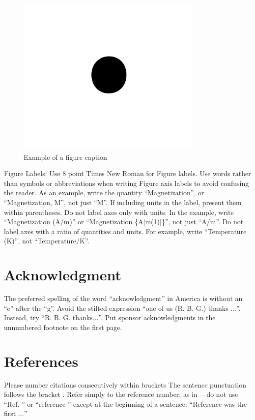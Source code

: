 \documentclass[conference]{IEEEtran}
\begin{document}
\begin{figure}[htbp]
\centering
\includegraphics[width=.9\linewidth]{./images/figure1.png}
\caption{Example of a figure caption}
\end{figure}

Figure Labels: Use 8 point Times New Roman for Figure labels. Use words rather than symbols or abbreviations when writing Figure axis labels to avoid confusing the reader. As an example, write the quantity ``Magnetization'', or ``Magnetization, M'', not just ``M''. If including units in the label, present them within parentheses. Do not label axes only with units. In the example, write ``Magnetization (A/m)'' or ``Magnetization \{A[m(1)]\}'', not just ``A/m''. Do not label axes with a ratio of quantities and units. For example, write ``Temperature (K)'', not ``Temperature/K''.

\section*{Acknowledgment}
\label{sec:orgd88a2d6}
  The preferred spelling of the word ``acknowledgment'' in America is without an ``e'' after the ``g''. Avoid the stilted expression ``one of us (R. B. G.) thanks \(\ldots\)''. Instead, try ``R. B. G. thanks\(\ldots\)''. Put sponsor 
acknowledgments in the unnumbered footnote on the first page.

\section*{References}
\label{sec:org6341485}
  Please number citations consecutively within brackets \cite{huang21_fusion_algor_visib_infrar_image}  The sentence punctuation follows the bracket \cite{jacobs63_fine_partic_thin_films_exchan}. Refer simply to the reference number, as in \cite{maxwellil_magnet_probl}---do not use ``Ref. \cite{muller55_certain_infin_integ_invol_bessel_funct}'' or ``reference \cite{maxwellil_magnet_probl}'' except at 
the beginning of a sentence: ``Reference \cite{b3} was the first \(\ldots\)''
\end{document}
